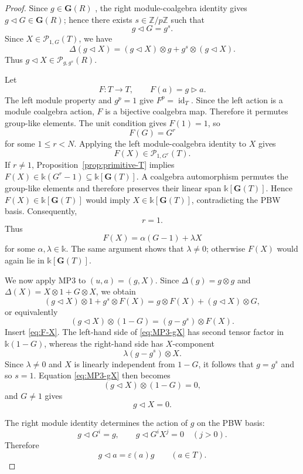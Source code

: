 \documentclass[twoside,11pt]{amsart}
\newcommand{\K}{\mathds{k}}
\newcommand{\Z}{\mathbb{Z}}
\newcommand{\G}{\mathbf{G}}
\newcommand{\Pp}{\mathcal{P}}
\newcommand{\id}{\operatorname{id}}
\begin{document}
	\begin{proof}
		Since $g\in\G(R)$ , the right module-coalgebra identity gives
		$g\triangleleft G\in \G(R)$; hence there exists $s\in\Z/p\Z$ such that
		\[
		g\triangleleft G=g^s.
		\]
		Since $X\in\Pp_{1,G}(T)$, we have
		\begin{equation}\label{eq:right-gX-coprod}
			\Delta(g\triangleleft X)
			=(g\triangleleft X)\otimes g
			+g^s\otimes(g\triangleleft X).
		\end{equation}
		Thus $g\triangleleft X\in\Pp_{g,g^s}(R)$.
		
		Let
		\[
		F:T\to T,\qquad F(a)=g\triangleright a.
		\]
		The left module property and $g^p=1$ give $F^p=\id_T$. Since the left action
		is a module coalgebra action, $F$ is a bijective coalgebra map. Therefore it
		permutes group-like elements. The unit condition gives $F(1)=1$, so
		\[
		F(G)=G^r
		\]
		for some $1\le r<N$. Applying the left module-coalgebra identity to $X$ gives
		\[
		F(X)\in\Pp_{1,G^r}(T).
		\]
		If $r\ne1$, Proposition~\ref{prop:primitive-T} implies
		$F(X)\in\K(G^r-1)\subseteq\K[\G(T)]$. A coalgebra automorphism permutes the
		group-like elements and therefore preserves their linear span
		$\K[\G(T)]$. Hence $F(X)\in\K[\G(T)]$ would imply
		$X\in\K[\G(T)]$, contradicting the PBW basis. Consequently,
		\[
		r=1.
		\]
		Thus
		\begin{equation}\label{eq:F-X}
			F(X)=\alpha(G-1)+\lambda X
		\end{equation}
		for some $\alpha,\lambda\in\K$. The same argument shows that $\lambda\ne0$;
		otherwise $F(X)$ would again lie in $\K[\G(T)]$.
		
		We now apply MP3 to $(u,a)=(g,X)$. Since
		$\Delta(g)=g\otimes g$ and $\Delta(X)=X\otimes1+G\otimes X$, we obtain
		\[
		(g\triangleleft X)\otimes1+g^s\otimes F(X)
		=g\otimes F(X)+(g\triangleleft X)\otimes G,
		\]
		or equivalently
		\begin{equation}\label{eq:MP3-gX}
			(g\triangleleft X)\otimes(1-G)
			=(g-g^s)\otimes F(X).
		\end{equation}
		Insert \eqref{eq:F-X}. The left-hand side of \eqref{eq:MP3-gX} has second
		tensor factor in $\K(1-G)$, whereas the right-hand side has $X$-component
		\[
		\lambda(g-g^s)\otimes X.
		\]
		Since $\lambda\ne0$ and $X$ is linearly independent from $1-G$, it follows
		that $g=g^s$ and so $s=1$. Equation \eqref{eq:MP3-gX} then becomes
		\[
		(g\triangleleft X)\otimes(1-G)=0,
		\]
		and $G\ne1$ gives
		\[
		g\triangleleft X=0.
		\]
		
		The right module identity determines the action of $g$ on the PBW basis:
		\[
		g\triangleleft G^i=g,
		\qquad
		g\triangleleft G^iX^j=0\quad(j>0).
		\]
		Therefore
		\begin{equation}\label{eq:g-right-trivial}
			g\triangleleft a=\varepsilon(a)g
			\qquad(a\in T).
		\end{equation}
		

\end{proof}
\end{document}
